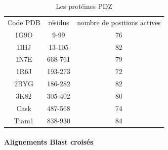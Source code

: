 \label{sec:ensemble_PDZ}

    \begin{table}[!htbp]
      \centering

      \begin{tabular}{ccc}

        \toprule
        Code PDB & résidus & nombre de positions actives\\
        \cmidrule{1-3}
        1G9O  & 	9-99	 & 	76	 \\
        1IHJ  & 	13-105	 & 	82	 \\
        1N7E  & 	668-761	 & 	79	 \\
        1R6J  & 	193-273	 & 	72	 \\
        2BYG  & 	186-282	 & 	82	 \\
        3K82  & 	305-402	 & 	80	 \\
        Cask  & 	487-568	 & 	74	 \\
        Tiam1 & 	838-930	 & 	84	 \\
        \bottomrule

      \end{tabular}      
      \caption{Les protéines PDZ}
\label{tab:protéines_PDZ}      
    \end{table}

\paragraph{Alignements Blast croisés}

